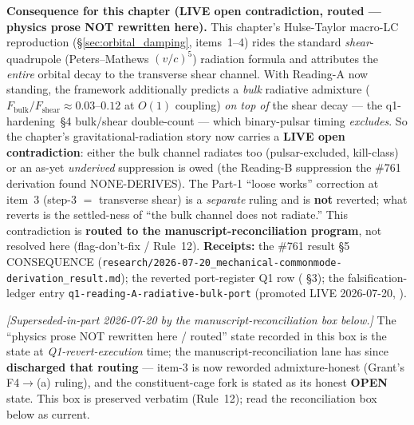 \begin{warningbox}
\medskip
\noindent\textbf{Consequence for this chapter (LIVE open contradiction, routed
--- physics prose NOT rewritten here).} This chapter's Hulse-Taylor macro-LC
reproduction (\S\ref{sec:orbital_damping}, items~1--4) rides the standard
\emph{shear}-quadrupole (Peters--Mathews $(v/c)^5$) radiation formula and
attributes the \emph{entire} orbital decay to the transverse shear channel. With
Reading-A now standing, the framework additionally predicts a \emph{bulk}
radiative admixture ($F_{\mathrm{bulk}}/F_{\mathrm{shear}}\approx0.03$--$0.12$ at
$O(1)$ coupling) \emph{on top of} the shear decay --- the q1-hardening~\S4
bulk/shear double-count --- which binary-pulsar timing \emph{excludes}. So the
chapter's gravitational-radiation story now carries a \textbf{LIVE open
contradiction}: either the bulk channel radiates too (pulsar-excluded,
kill-class) or an as-yet \emph{underived} suppression is owed (the Reading-B
suppression the \#761 derivation found NONE-DERIVES). The Part-1 ``loose works''
correction at item~3 (step-3 $=$ transverse shear) is a \emph{separate} ruling and
is \textbf{not} reverted; what reverts is the settled-ness of ``the bulk channel
does not radiate.'' This contradiction is \textbf{routed to the
manuscript-reconciliation program}, not resolved here (flag-don't-fix / Rule~12).
\textbf{Receipts:} the \#761 result \S5 CONSEQUENCE
(\texttt{research/2026-07-20\_mechanical-commonmode-derivation\_result.md}); the
reverted port-register Q1 row
( \S3); the falsification-ledger entry
\texttt{q1-reading-A-radiative-bulk-port} (promoted LIVE 2026-07-20,
).

\medskip
\noindent\emph{[Superseded-in-part 2026-07-20 by the manuscript-reconciliation box below.]} The
``physics prose NOT rewritten here / routed'' state recorded in this box is the state at
\emph{Q1-revert-execution} time; the manuscript-reconciliation lane has since \textbf{discharged
that routing} --- item-3 is now reworded admixture-honest (Grant's F4$\to$(a) ruling), and the
constituent-cage fork is stated as its honest \textbf{OPEN} state. This box is preserved verbatim
(Rule~12); read the reconciliation box below as current.
\end{warningbox}

